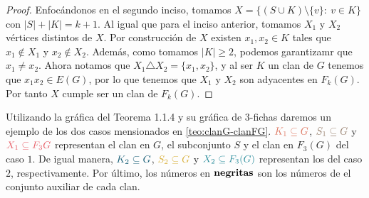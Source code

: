 \begin{proof}
        Enfoc\'andonos en el segundo inciso, tomamos $X = \{(S\cup K) \setminus
        \{v\}\colon\ v \in K \}$ con $|S| + |K| = k+1$. Al igual que para el inciso
        anterior, tomamos $X_1$ y $X_2$ v\'ertices distintos de $X$. Por
        construcci\'on de $X$ existen $x_1, x_2 \in K$ tales que $x_1 \notin
        X_1$ y $x_2 \notin X_2$. Adem\'as, como tomamos $|K| \geq 2$, podemos
        garantizamr que $x_1 \neq x_2$. Ahora notamos que $X_1 \triangle X_2 =
        \{x_1, x_2\}$, y al ser $K$ un clan de $G$ tenemos que $x_1x_2 \in
        E(G)$, por lo que tenemos que $X_1$ y $X_2$ son adyacentes en $F_k(G)$.
        Por tanto $X$ cumple ser un clan de $F_k(G)$.
    \end{proof}
    
    Utilizando la gr\'afica del Teorema 1.1.4 y su gr\'afica de $3$-fichas
    daremos un ejemplo de los dos casos mensionados en \cref{teo:clanG-clanFG}.
    ${\color{salmon}K_1 \subseteq G}$, ${\color{baige}S_1\subseteq G}$ y
    ${\color{rosa}X_1\subseteq F_3{G}}$ representan el clan en $G$, el
    subconjunto $S$ y el clan en $F_3(G)$ del caso $1$. De igual manera,
    ${\color{azulOscuro}K_2\subseteq G}$, ${\color{oro}S_2\subseteq
    G}$ y ${\color{azulMetal}X_2 \subseteq F_3(G)}$ representan los del caso
    $2$, respectivamente. Por \'ultimo, los n\'umeros en ${\bf negritas}$ son
    los n\'umeros de el conjunto auxiliar de cada clan.

